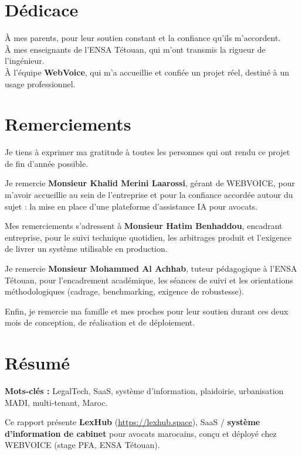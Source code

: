 \chapter*{Dédicace}

À mes parents, pour leur soutien constant et la confiance qu'ils m'accordent.\\[0.4em]
À mes enseignants de l'ENSA Tétouan, qui m'ont transmis la rigueur de l'ingénieur.\\[0.4em]
À l'équipe \textbf{WebVoice}, qui m'a accueillie et confiée un projet réel, destiné à un usage professionnel.

\chapter*{Remerciements}

Je tiens à exprimer ma gratitude à toutes les personnes qui ont rendu ce projet de fin d'année possible.

Je remercie \textbf{Monsieur Khalid Merini Laarossi}, gérant de WEBVOICE, pour m'avoir accueillie au sein de l'entreprise et pour la confiance accordée autour du sujet : la mise en place d'une plateforme d'assistance IA pour avocats.

Mes remerciements s'adressent à \textbf{Monsieur Hatim Benhaddou}, encadrant entreprise, pour le suivi technique quotidien, les arbitrages produit et l'exigence de livrer un système utilisable en production.

Je remercie \textbf{Monsieur Mohammed Al Achhab}, tuteur pédagogique à l'ENSA Tétouan, pour l'encadrement académique, les séances de suivi et les orientations méthodologiques (cadrage, benchmarking, exigence de robustesse).

Enfin, je remercie ma famille et mes proches pour leur soutien durant ces deux mois de conception, de réalisation et de déploiement.

\chapter*{Résumé}

\textbf{Mots-clés :} LegalTech, SaaS, système d'information, plaidoirie, urbanisation MADI, multi-tenant, Maroc.

Ce rapport présente \textbf{LexHub} (\url{https://lexhub.space}), SaaS / \textbf{système d'information de cabinet} pour avocats marocains, conçu et déployé chez WEBVOICE (stage PFA, ENSA Tétouan).


